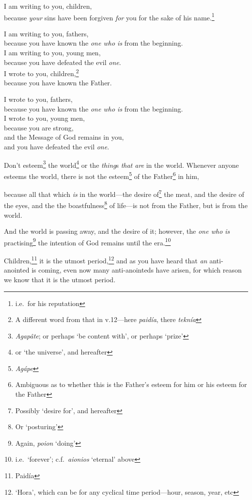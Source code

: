 \documentclass[article]{memoir}%
\newcounter{vnum}
\newcommand{\vnum}{%
	\textsuperscript{\thevnum}%
	\addtocounter{vnum}{1}%
}
\newcommand{\infer}[1]{\textit{#1}}
\newcommand{\focus}[1]{{#1}}
\newcommand{\lx}[1]{\textit{#1}}
\newcommand{\lxx}[2]{\textit{#1} `#2'}
\begin{document}
\indent \vnum I am writing to you, children,\\
\indent \indent because \infer{your} sins have been forgiven \infer{for} you for the sake of his name.\footnote{i.e.\ for his reputation} \\
\indent \vnum I am writing to you, fathers,\\
\indent \indent because you have known the \infer{one who is} from the beginning.\\
\indent I am writing to you, young men,\\
\indent \indent because you have defeated the evil \infer{one}.\\
\indent I wrote to you, children,\footnote{A different word from that in v.12---here \lx{paidía}, there \lx{teknía}}\\
\indent \indent because you have known the Father.\\
\indent \vnum I wrote to you, fathers,\\
\indent \indent because you have known the \infer{one who is} from the beginning.\\
\indent I wrote to you, young men,\\
\indent \indent because you are strong,\\
\indent \indent \indent and the Message of God remains in you,\\
\indent \indent \indent and you have defeated the evil \infer{one}.

\vnum Don't esteem\footnote{\lx{Agapâte}; or perhaps `be content with', or perhaps `prize'} the world\footnote{or `the universe', and hereafter} or the \infer{thing}s\infer{ that are} in the world. Whenever anyone esteems the world, there is not the esteem\footnote{\lx{Agápe}} of the Father\footnote{Ambiguous as to whether this is the Father's esteem for him or his esteem for the Father} in him, \vnum because all that which \infer{is} in the world---the desire of\footnote{Possibly `desire for', and hereafter} the meat, and the desire of the eyes, and the the boastfulness\footnote{Or `posturing'} of life---is \focus{not} from the Father, but is \focus{from the world}. \vnum And the world is passing away, and the desire of it; however, the \infer{one who is} practising\footnote{Again, \lxx{poion}{doing}} the intention of God remains until the era.\footnote{i.e.\ `forever'; c.f.\ \lxx{aionios}{eternal} above}

Children,\footnote{Paidía} it is the utmost period,\footnote{`Hora', which can be for any cyclical time period---hour, season, year, etc} and as you have heard that \infer{an} anti-anointed is coming, even now many anti-anointeds have arisen, for which reason we know that it is the utmost period.
\end{document}
